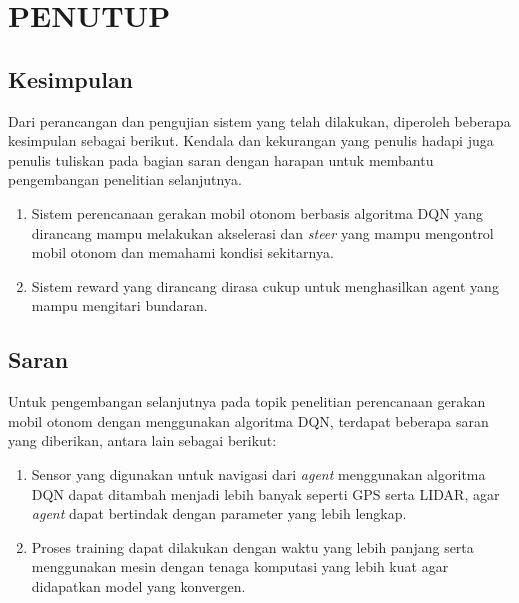 \chapter{PENUTUP}
\label{chap:penutup}


\section{Kesimpulan}
\label{sec:kesimpulan}

Dari perancangan dan pengujian sistem yang telah dilakukan, diperoleh beberapa kesimpulan sebagai berikut. Kendala dan kekurangan yang penulis hadapi juga penulis tuliskan pada bagian saran dengan harapan untuk membantu pengembangan penelitian selanjutnya.

\begin{enumerate}[nolistsep]

  \item Sistem perencanaan gerakan mobil otonom berbasis algoritma DQN yang dirancang mampu melakukan akselerasi dan \textit{steer} yang mampu mengontrol mobil otonom dan memahami kondisi sekitarnya.

  \item Sistem reward yang dirancang dirasa cukup untuk menghasilkan agent yang mampu mengitari bundaran.

\end{enumerate}

\section{Saran}
\label{chap:saran}

Untuk pengembangan selanjutnya pada topik penelitian perencanaan gerakan mobil otonom dengan menggunakan algoritma DQN, terdapat beberapa saran yang diberikan, antara lain sebagai berikut:

\begin{enumerate}[nolistsep]

  \item Sensor yang digunakan untuk navigasi dari \textit{agent }menggunakan algoritma DQN dapat ditambah menjadi lebih banyak seperti GPS serta LIDAR, agar \textit{agent} dapat bertindak dengan parameter yang lebih lengkap.

  \item Proses training dapat dilakukan dengan waktu yang lebih panjang serta menggunakan mesin dengan tenaga komputasi yang lebih kuat agar didapatkan model yang konvergen.

  \iffalse
  \item Memperbaiki sistem award, dimana sebaiknya memikirkan sudut kendaraan terhadap pusat bundaran, serta jarak kendaraan terhadap bagian tengah jalan.

  \item Membuat tolak ukur metrik yang memadai untuk bagian pengujian model berupa plot riwayat gerakan kendaraan serta plot kecepatan kendaraan.
  \fi

\end{enumerate}
